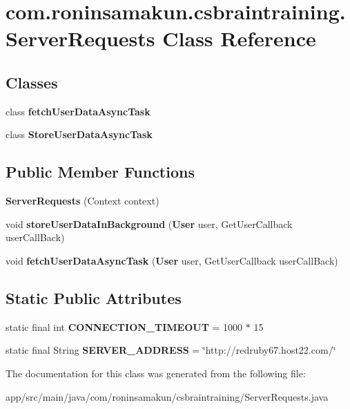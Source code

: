 \section{com.\+roninsamakun.\+csbraintraining.\+Server\+Requests Class Reference}
\label{classcom_1_1roninsamakun_1_1csbraintraining_1_1_server_requests}
\subsection*{Classes}
\begin{DoxyCompactItemize}
\item 
class {\bf fetch\+User\+Data\+Async\+Task}
\item 
class {\bf Store\+User\+Data\+Async\+Task}
\end{DoxyCompactItemize}
\subsection*{Public Member Functions}
\begin{DoxyCompactItemize}
\item 
{\bfseries Server\+Requests} (Context context)\label{classcom_1_1roninsamakun_1_1csbraintraining_1_1_server_requests_ab1e5e5cc406c9d6dcdd2cf561d4eb2c0}

\item 
void {\bfseries store\+User\+Data\+In\+Background} ({\bf User} user, Get\+User\+Callback user\+Call\+Back)\label{classcom_1_1roninsamakun_1_1csbraintraining_1_1_server_requests_a07945bcbf4cc4093120d2660472fdbc9}

\item 
void {\bfseries fetch\+User\+Data\+Async\+Task} ({\bf User} user, Get\+User\+Callback user\+Call\+Back)\label{classcom_1_1roninsamakun_1_1csbraintraining_1_1_server_requests_a3a5ab2ea1409b065a56c3e4755d647e5}

\end{DoxyCompactItemize}
\subsection*{Static Public Attributes}
\begin{DoxyCompactItemize}
\item 
static final int {\bfseries C\+O\+N\+N\+E\+C\+T\+I\+O\+N\+\_\+\+T\+I\+M\+E\+O\+U\+T} = 1000 $\ast$ 15\label{classcom_1_1roninsamakun_1_1csbraintraining_1_1_server_requests_a77a72096731da79ddb9c31c608cad0af}

\item 
static final String {\bfseries S\+E\+R\+V\+E\+R\+\_\+\+A\+D\+D\+R\+E\+S\+S} = \char`\"{}http\+://redruby67.\+host22.\+com/\char`\"{}\label{classcom_1_1roninsamakun_1_1csbraintraining_1_1_server_requests_a42a4dc0674d1621251f98b9bb1d77f7e}

\end{DoxyCompactItemize}


The documentation for this class was generated from the following file\+:\begin{DoxyCompactItemize}
\item 
app/src/main/java/com/roninsamakun/csbraintraining/Server\+Requests.\+java\end{DoxyCompactItemize}
